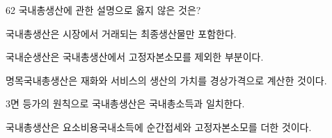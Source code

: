 \begin{question}{62}
국내총생산에 관한 설명으로 옳지 않은 것은?
\begin{choices}
  \item 국내총생산은 시장에서 거래되는 최종생산물만 포함한다.
  \item 국내순생산은 국내총생산에서 고정자본소모를 제외한 부분이다.
  \item 명목국내총생산은 재화와 서비스의 생산의 가치를 경상가격으로 계산한 것이다.
  \item 3면 등가의 원칙으로 국내총생산은 국내총소득과 일치한다.
  \item 국내총생산은 요소비용국내소득에 순간접세와 고정자본소모를 더한 것이다.
\end{choices}
\end{question}
